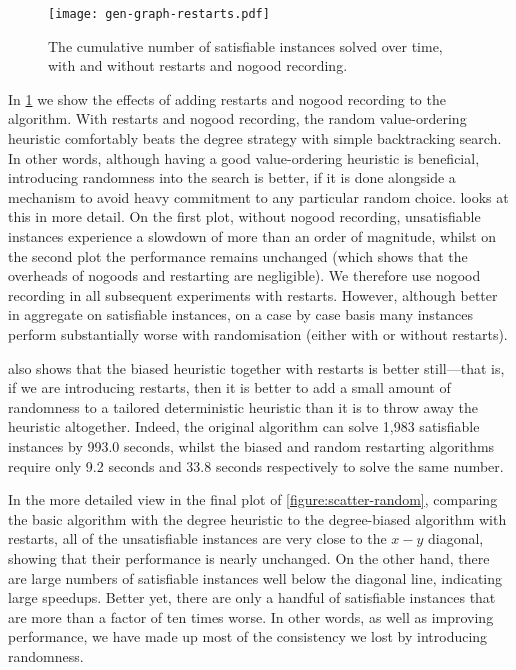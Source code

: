 \documentclass[letterpaper]{article} %
\begin{document}
\begin{figure}[tb]
    \centering
    \texttt{[image: gen-graph-restarts.pdf]}

    \caption{The cumulative number of satisfiable instances solved over time, with and without
    restarts and nogood recording.}
    \label{figure:restarts}
\end{figure}

In \cref{figure:restarts} we show the effects of adding restarts and nogood recording to the
algorithm. With restarts and nogood recording,
the random value-ordering heuristic comfortably beats the degree strategy with simple backtracking
search. In other
words, although having a good value-ordering heuristic is beneficial, introducing randomness into
the search is better, if it is done alongside a mechanism to avoid heavy commitment to any
particular random choice.  looks at
this in more detail. On the first plot, without nogood recording, unsatisfiable instances
experience a slowdown of more than an order of magnitude, whilst on the second plot the
performance remains unchanged (which shows that the overheads of nogoods and restarting are
negligible). We therefore use nogood recording in all subsequent experiments with restarts. However,
although better in aggregate on satisfiable instances, on a case by case basis many instances
perform substantially worse with randomisation (either with or without restarts).

 also shows that the biased heuristic together with restarts is better
still---that is, if we are introducing restarts, then it is better to add a small amount of
randomness to a tailored deterministic heuristic than it is to throw away the heuristic altogether.
Indeed, the original algorithm can solve 1,983 satisfiable instances by 993.0 seconds, whilst the
biased and random restarting algorithms require only 9.2 seconds and 33.8 seconds respectively to
solve the same number.

In the more detailed view in the final plot of \cref{figure:scatter-random}, comparing the
basic algorithm with the degree heuristic to the degree-biased algorithm with restarts, all of the
unsatisfiable instances are very close to the $x-y$ diagonal, showing that their performance is
nearly unchanged. On the other hand, there are large numbers of satisfiable instances well below the
diagonal line, indicating large speedups.  Better yet, there are only a handful of satisfiable
instances that are more than a factor of ten times worse. In other words, as well as improving
performance, we have made up most of the consistency we lost by introducing randomness.
\end{document}
